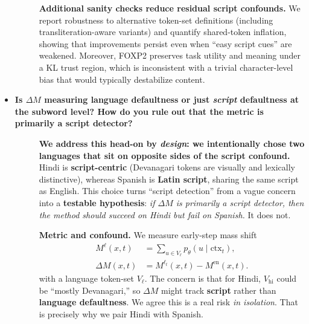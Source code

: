 \begin{itemize}[leftmargin=1.5em]
\begin{description}
\item[]
\textbf{Additional sanity checks reduce residual script confounds.}
We report robustness to alternative token-set definitions (including transliteration-aware variants) and quantify shared-token inflation, showing that improvements persist even when “easy script cues” are weakened.
Moreover, FOXP2 preserves task utility and meaning under a KL trust region, which is inconsistent with a trivial character-level bias that would typically destabilize content.

\end{description}


\item[\ding{93}] \textbf{Is $\Delta M$ measuring language defaultness or just \emph{script} defaultness at the subword level? How do you rule out that the metric is primarily a script detector?}
\begin{description}
\item[] \textbf{We address this head-on by \emph{design}: we intentionally chose \textbf{two languages} that sit on opposite sides of the script confound.} Hindi is \textbf{script-centric} (Devanagari tokens are visually and lexically distinctive), whereas Spanish is \textbf{Latin script}, sharing the same script as English. This choice turns “script detection” from a vague concern into a \textbf{testable hypothesis}: \emph{if $\Delta M$ is primarily a script detector, then the method should succeed on Hindi but fail on Spanish.} It does not.

\vspace{4pt}
\textbf{Metric and confound.} We measure early-step mass shift
\[
\begin{aligned}
M^{\ell}(x,t) &= \sum_{u\in V_{\ell}}p_\theta(u\mid \mathrm{ctx}_t),\\
\Delta M(x,t) &= M^{\ell_t}(x,t)-M^{\mathrm{en}}(x,t).
\end{aligned}
\]
with a language token-set $V_\ell$. The concern is that for Hindi, $V_{\mathrm{hi}}$ could be “mostly Devanagari,” so $\Delta M$ might track \textbf{script} rather than \textbf{language defaultness}. We agree this is a real risk \emph{in isolation}. That is precisely why we pair Hindi with Spanish.


\end{description}
\end{itemize}
